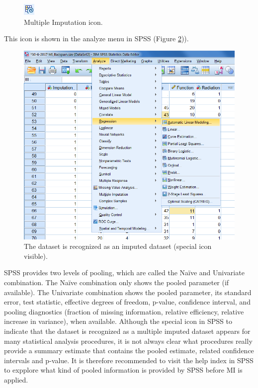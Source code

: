 \documentclass[
]{book}
\begin{document}
\begin{figure}

{\centering \includegraphics[width=0.05\linewidth]{images/fig5.3} 

}

\caption{Multiple Imputation icon.}\label{fig:fig5-3}
\end{figure}

This icon is shown in the analyze menu in SPSS (Figure \ref{fig:fig5-4b})).

\begin{figure}

{\centering \includegraphics[width=0.9\linewidth]{images/fig5.4b} 

}

\caption{The dataset is recognized as an imputed dataset (special icon visible).}\label{fig:fig5-4b}
\end{figure}

SPSS provides two levels of pooling, which are called the Naïve and Univariate combination. The Naïve combination only shows the pooled parameter (if available). The Univariate combination shows the pooled parameter, its standard error, test statistic, effective degrees of freedom, p-value, confidence interval, and pooling diagnostics (fraction of missing information, relative efficiency, relative increase in variance), when available. Although the special icon in SPSS to indicate that the dataset is recognized as a multiple imputed dataset appears for many statistical analysis procedures, it is not always clear what procedures really provide a summary estimate that contains the pooled estimate, related confidence intervals and p-value. It is therefore recommended to visit the help index in SPSS to expplore what kind of pooled information is provided by SPSS before MI is applied.
\end{document}
